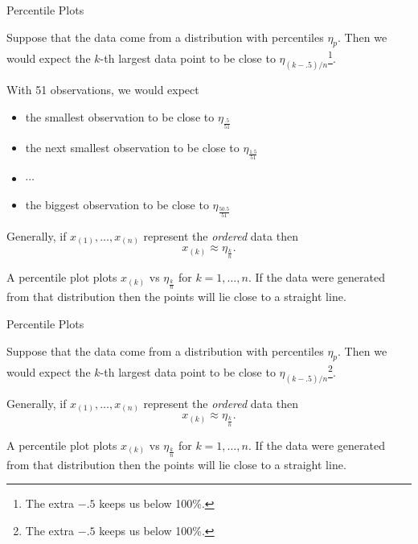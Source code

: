 \begin{frame}

\begin{block}{Percentile Plots}

Suppose that the data come from a distribution with percentiles $\eta_p$. Then we would expect the $k$-th largest data point to be close to $\eta_{(k-.5)/n}$\footnote{The extra $-.5$ keeps us below 100\%.}. 

\bigskip

With 51 observations, we would expect
\begin{itemize}
\item the smallest observation to be close to $\eta_{\frac{.5}{51}}$
\item the next smallest observation to be close to $\eta_{\frac{1.5}{51}}$
\item $\cdots$
\item the biggest observation to be close to $\eta_{\frac{50.5}{51}}$
\end{itemize}

\bigskip

Generally, if $x_{(1)},\ldots,x_{(n)}$ represent the \textit{ordered} data then
$$
x_{(k)}\approx \eta_{\frac{k}{n}}.
$$

\bigskip

A percentile plot plots $x_{(k)}$ vs $\eta_{\frac{k}{n}}$ for $k=1,\ldots,n$. If the data were generated from that distribution then the points will lie close to a straight line.
\end{block}
\end{frame}

\begin{frame}

\begin{block}{Percentile Plots}

Suppose that the data come from a distribution with percentiles $\eta_p$. Then we would expect the $k$-th largest data point to be close to $\eta_{(k-.5)/n}$\footnote{The extra $-.5$ keeps us below 100\%.}. 

\bigskip

Generally, if $x_{(1)},\ldots,x_{(n)}$ represent the \textit{ordered} data then
$$
x_{(k)}\approx \eta_{\frac{k}{n}}.
$$

\bigskip

A percentile plot plots $x_{(k)}$ vs $\eta_{\frac{k}{n}}$ for $k=1,\ldots,n$. If the data were generated from that distribution then the points will lie close to a straight line.
\end{block}
\end{frame}




